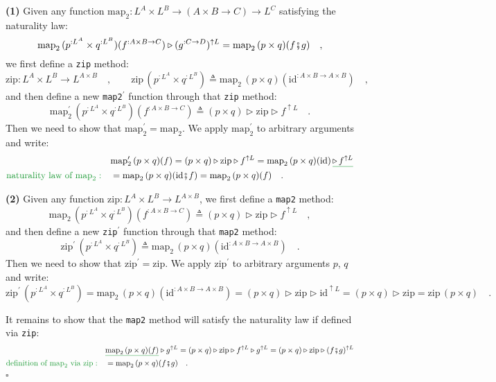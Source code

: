 \textbf{(1)} Given any function $\text{map}_{2}:L^{A}\times L^{B}\rightarrow\left(A\times B\rightarrow C\right)\rightarrow L^{C}$
satisfying the naturality law:
\[
\text{map}_{2}\,(p^{:L^{A}}\times q^{:L^{B}})(f^{:A\times B\rightarrow C})\triangleright(g^{:C\rightarrow D})^{\uparrow L}=\text{map}_{2}\,(p\times q)(f\bef g)\quad,
\]
we first define a \lstinline!zip! method:
\[
\text{zip}:L^{A}\times L^{B}\rightarrow L^{A\times B}\quad,\quad\quad\text{zip}\,(p^{:L^{A}}\times q^{:L^{B}})\triangleq\text{map}_{2}\,(p\times q)(\text{id}^{:A\times B\rightarrow A\times B})\quad,
\]
and then define a new \lstinline!map2!$^{\prime}$ function through
that \lstinline!zip! method:
\[
\text{map}_{2}^{\prime}\,(p^{:L^{A}}\times q^{:L^{B}})(f^{:A\times B\rightarrow C})\triangleq(p\times q)\triangleright\text{zip}\triangleright f^{\uparrow L}\quad.
\]
Then we need to show that $\text{map}_{2}^{\prime}=\text{map}_{2}$.
We apply $\text{map}_{2}^{\prime}$ to arbitrary arguments and write:
\begin{align*}
 & \text{map}_{2}^{\prime}\,(p\times q)(f)=(p\times q)\triangleright\text{zip}\triangleright f^{\uparrow L}=\text{map}_{2}\,(p\times q)(\text{id})\,\gunderline{\triangleright\,f^{\uparrow L}}\\
{\color{greenunder}\text{naturality law of }\text{map}_{2}:}\quad & =\text{map}_{2}\,(p\times q)(\text{id}\bef f)=\text{map}_{2}\,(p\times q)(f)\quad.
\end{align*}

\textbf{(2)} Given any function $\text{zip}:L^{A}\times L^{B}\rightarrow L^{A\times B}$,
we first define a \lstinline!map2! method:
\[
\text{map}_{2}\,(p^{:L^{A}}\times q^{:L^{B}})(f^{:A\times B\rightarrow C})\triangleq(p\times q)\triangleright\text{zip}\triangleright f^{\uparrow L}\quad,
\]
and then define a new \lstinline!zip!$^{\prime}$ function through
that \lstinline!map2! method:
\[
\text{zip}^{\prime}\,(p^{:L^{A}}\times q^{:L^{B}})\triangleq\text{map}_{2}\,(p\times q)(\text{id}^{:A\times B\rightarrow A\times B})\quad.
\]
Then we need to show that $\text{zip}^{\prime}=\text{zip}$. We apply
$\text{zip}^{\prime}$ to arbitrary arguments $p$, $q$ and write:
\[
\text{zip}^{\prime}\,(p^{:L^{A}}\times q^{:L^{B}})=\text{map}_{2}\,(p\times q)(\text{id}^{:A\times B\rightarrow A\times B})=(p\times q)\triangleright\text{zip}\triangleright\text{id}^{\uparrow L}=(p\times q)\triangleright\text{zip}=\text{zip}\,(p\times q)\quad.
\]

It remains to show that the \lstinline!map2! method will satisfy
the naturality law if defined via \lstinline!zip!:
\begin{align*}
 & \gunderline{\text{map}_{2}\,(p\times q)(f)}\triangleright g^{\uparrow L}=(p\times q)\triangleright\text{zip}\triangleright f^{\uparrow L}\triangleright g^{\uparrow L}=(p\times q)\triangleright\text{zip}\triangleright(f\bef g)^{\uparrow L}\\
{\color{greenunder}\text{definition of }\text{map}_{2}\text{ via }\text{zip}:}\quad & =\text{map}_{2}\,(p\times q)(f\bef g)\quad.
\end{align*}
$\square$


